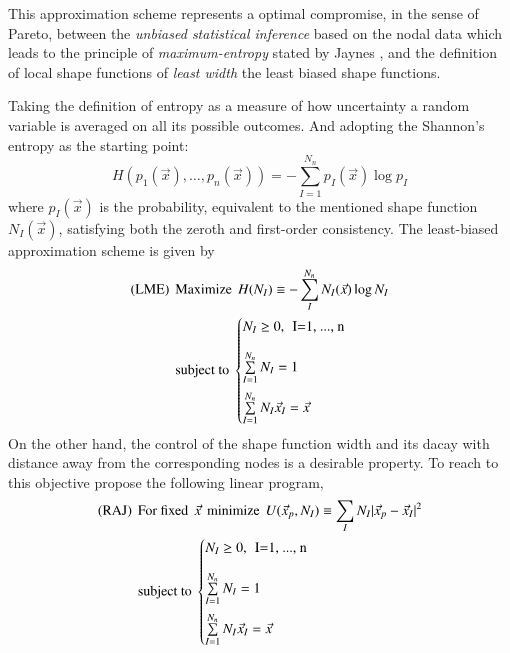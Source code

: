 \documentclass[preprint,12pt,a4paper]{elsarticle}
\begin{document}
This approximation scheme represents a optimal compromise, in the sense of
Pareto, between the \textit{unbiased statistical inference} based on
the nodal data which leads to the principle of \textit{maximum-entropy}
stated by Jaynes \cite{Jaynes1957}, and the definition of local shape
functions of \textit{least width} the least biased shape functions.

Taking the definition of entropy as a measure of how uncertainty a
random variable is averaged on all its possible outcomes. And adopting
the Shannon's entropy as the starting point:
\begin{equation}
  \label{eq:Shannon-entropy}
  H(p_1(\vec{x}),\ldots,p_n(\vec{x})) = -\sum^{N_n}_{I=1}{p_I(\vec{x})\log p_I }
\end{equation}
where $p_I(\vec{x})$ is the probability, equivalent to the mentioned
shape function $N_I(\vec{x})$, satisfying both the zeroth and
first-order consistency. The least-biased approximation scheme is
given by
\begin{align*}
  \label{eq:least-biased-approximation-scheme}
  \text{(LME)} \hspace{0.15cm} &\text{Maximize} \hspace{0.15cm} H(N_I) \equiv
  -\sum_{I}^{N_n}{N_I(\vec{x})\log N_I }\\
  &\text{subject to}\
  \begin{cases}
    N_I \ge 0, \hspace{0.15cm} \text{I=1, ..., n} \\[1em]   
    \sum\limits_{I=1}^{N_n}{N_I} = 1 \\[1em]   
    \sum\limits_{I=1}^{N_n}{N_I \vec{x}_I} = \vec{x} \\
  \end{cases}
\end{align*}
On the other hand, the control of the shape function width and its
dacay with distance away from the corresponding nodes is a desirable property. To reach to this objective \cite{Arroyo2006} propose the following linear program,
\begin{align*}
  \label{eq:RAJAN}
  \text{(RAJ)} \hspace{0.15cm} &\text{For fixed} \hspace{0.15cm}
  \vec{x} \hspace{0.15cm} \text{minimize} \hspace{0.15cm} U(\vec{x}_p,N_I) \equiv
\sum_I N_I |\vec{x}_p - \vec{x}_I |^2\\
  &\text{subject to}\
  \begin{cases}
    N_I \ge 0, \hspace{0.15cm} \text{I=1, ..., n} \\[1em]   
    \sum\limits_{I=1}^{N_n}{N_I} = 1 \\[1em]   
    \sum\limits_{I=1}^{N_n}{N_I \vec{x}_I} = \vec{x} \\
  \end{cases}
\end{align*}
\end{document}
